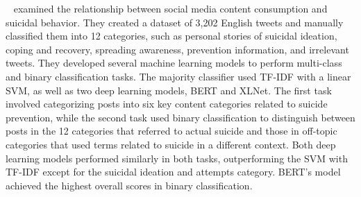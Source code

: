 \documentclass[sn-mathphys,Numbered]{sn-jnl}%
\begin{document}
~\citet{info:doi/10.2196/34705} examined the relationship between social media content consumption and suicidal behavior. They created a dataset of 3,202 English tweets and manually classified them into 12 categories, such as personal stories of suicidal ideation, coping and recovery, spreading awareness, prevention information, and irrelevant tweets. They developed several machine learning models to perform multi-class and binary classification tasks. The majority classifier used TF-IDF with a linear SVM, as well as two deep learning models, BERT and XLNet. The first task involved categorizing posts into six key content categories related to suicide prevention, while the second task used binary classification to distinguish between posts in the 12 categories that referred to actual suicide and those in off-topic categories that used terms related to suicide in a different context. Both deep learning models performed similarly in both tasks, outperforming the SVM with TF-IDF except for the suicidal ideation and attempts category. BERT's model achieved the highest overall scores in binary classification.

\end{document}
